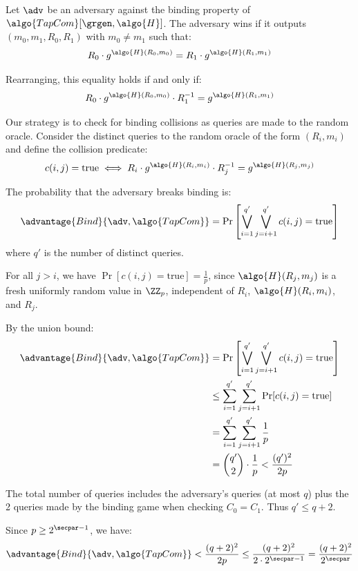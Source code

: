 \ifsolutions
\begin{mysolution}
  Let $\adv$ be an adversary against the binding property of $\algo{TapCom}[\grgen, \algo{H}]$. The adversary wins if it outputs $(m_0, m_1, R_0, R_1)$ with $m_0 \neq m_1$ such that:
  \[
  R_0 \cdot g^{\algo{H}(R_0, m_0)} = R_1 \cdot g^{\algo{H}(R_1, m_1)}
  \]

  Rearranging, this equality holds if and only if:
  \[
  R_0 \cdot g^{\algo{H}(R_0, m_0)} \cdot R_1^{-1} = g^{\algo{H}(R_1, m_1)}
  \]

  Our strategy is to check for binding collisions as queries are made to the random oracle.
  Consider the distinct queries to the random oracle of the form $(R_i, m_i)$ and define the collision predicate:
  \[
  c(i, j) = \text{true} \iff R_i \cdot g^{\algo{H}(R_i, m_i)} \cdot R_j^{-1} = g^{\algo{H}(R_j, m_j)}
  \]
  
  The probability that the adversary breaks binding is:
  \[
  \advantage{Bind}{\adv, \algo{TapCom}} = \Pr\left[\bigvee_{i=1}^{q'} \bigvee_{j=i+1}^{q'} c(i,j) = \text{true}\right]
  \]
  where $q'$ is the number of distinct queries.
  
  For all $j > i$, we have $\Pr[c(i,j) = \text{true}] = \frac{1}{p}$, since $\algo{H}(R_j, m_j)$ is a fresh uniformly random value in $\ZZ_p$, independent of $R_i$, $\algo{H}(R_i, m_i)$, and $R_j$.
  
  By the union bound:
  \begin{align*}
    \advantage{Bind}{\adv, \algo{TapCom}} &= \Pr\left[\bigvee_{i=1}^{q'} \bigvee_{j=i+1}^{q'} c(i,j) = \text{true}\right] \\
    &\leq \sum_{i=1}^{q'} \sum_{j=i+1}^{q'} \Pr[c(i,j) = \text{true}] \\
    &= \sum_{i=1}^{q'} \sum_{j=i+1}^{q'} \frac{1}{p} \\
    &= \binom{q'}{2} \cdot \frac{1}{p} < \frac{(q')^2}{2p}
  \end{align*}
  
  The total number of queries includes the adversary's queries (at most $q$) plus the 2 queries made by the binding game when checking $C_0 = C_1$. Thus $q' \leq q + 2$.
  
  Since $p \geq 2^{\secpar-1}$, we have:
  \[
  \advantage{Bind}{\adv, \algo{TapCom}} < \frac{(q+2)^2}{2p} \leq \frac{(q+2)^2}{2 \cdot 2^{\secpar-1}} = \frac{(q+2)^2}{2^\secpar}
  \]
\end{mysolution}
\fi

